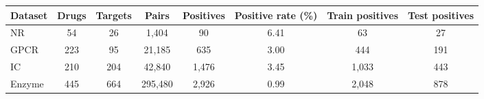 \begin{tabular}{lccccccc}
\toprule
Dataset & Drugs & Targets & Pairs & Positives & Positive rate (\%) & Train positives & Test positives \\
\midrule
NR & 54 & 26 & 1,404 & 90 & 6.41 & 63 & 27 \\
GPCR & 223 & 95 & 21,185 & 635 & 3.00 & 444 & 191 \\
IC & 210 & 204 & 42,840 & 1,476 & 3.45 & 1,033 & 443 \\
Enzyme & 445 & 664 & 295,480 & 2,926 & 0.99 & 2,048 & 878 \\
\bottomrule
\end{tabular}
